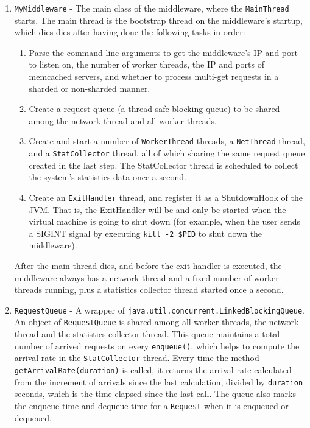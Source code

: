 \begin{enumerate}[noitemsep,topsep=0pt]
\item \texttt{MyMiddleware} - The main class of the middleware, where the \texttt{MainThread} starts. The main thread is the bootstrap thread on the middleware's startup, which dies dies after having done the following tasks in order:

\begin{enumerate}[noitemsep,topsep=0pt]
\item Parse the command line arguments to get the middleware's IP and port to listen on, the number of worker threads, the IP and ports of memcached servers, and whether to process multi-get requests in a sharded or non-sharded manner.
\item Create a request queue (a thread-safe blocking queue) to be shared among the network thread and all worker threads.
\item Create and start a number of \texttt{WorkerThread} threads, a \texttt{NetThread} thread, and a \texttt{StatCollector} thread, all of which sharing the same request queue created in the last step. The StatCollector thread is scheduled to collect the system's statistics data once a second.
\item Create an \texttt{ExitHandler} thread, and register it as a ShutdownHook of the JVM. That is, the ExitHandler will be and only be started when the virtual machine is going to shut down (for example, when the user sends a SIGINT signal by executing \texttt{kill -2 \$PID} to shut down the middleware).  
\end{enumerate}

After the main thread dies, and before the exit handler is executed, the middleware always has a network thread and a fixed number of worker threads running, plus a statistics collector thread started once a second.

\item \texttt{RequestQueue} - A wrapper of \texttt{java.util.concurrent.LinkedBlockingQueue}. An object of \texttt{RequestQueue} is shared among all worker threads, the network thread and the statistics collector thread. This queue maintains a total number of arrived requests on every \texttt{enqueue()}, which helps to compute the arrival rate in the \texttt{StatCollector} thread. Every time the method \texttt{getArrivalRate(duration)} is called, it returns the arrival rate calculated from the increment of arrivals since the last calculation, divided by \texttt{duration} seconds, which is the time elapsed since the last call. The queue also marks the enqueue time and dequeue time for a \texttt{Request} when it is enqueued or dequeued.


\end{enumerate}
